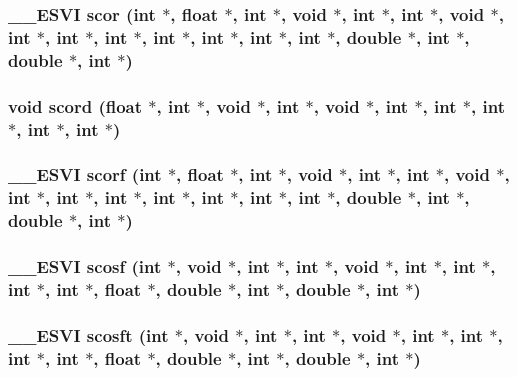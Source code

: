 \subsubsection{\setlength{\rightskip}{0pt plus 5cm}\_\-\_\-ESVI scor (int $\ast$, float $\ast$, int $\ast$, void $\ast$, int $\ast$, int $\ast$, void $\ast$, int $\ast$, int $\ast$, int $\ast$, int $\ast$, int $\ast$, int $\ast$, int $\ast$, double $\ast$, int $\ast$, double $\ast$, int $\ast$)}\label{essl_8h_590c54fa61664aa2058c0f45ea0874f6}


\subsubsection{\setlength{\rightskip}{0pt plus 5cm}void scord (float $\ast$, int $\ast$, void $\ast$, int $\ast$, void $\ast$, int $\ast$, int $\ast$, int $\ast$, int $\ast$, int $\ast$)}\label{essl_8h_312f791c7ec6ad66177cfa896adea156}


\subsubsection{\setlength{\rightskip}{0pt plus 5cm}\_\-\_\-ESVI scorf (int $\ast$, float $\ast$, int $\ast$, void $\ast$, int $\ast$, int $\ast$, void $\ast$, int $\ast$, int $\ast$, int $\ast$, int $\ast$, int $\ast$, int $\ast$, int $\ast$, double $\ast$, int $\ast$, double $\ast$, int $\ast$)}\label{essl_8h_f3d9e592d58086784c64efe83cae3060}


\subsubsection{\setlength{\rightskip}{0pt plus 5cm}\_\-\_\-ESVI scosf (int $\ast$, void $\ast$, int $\ast$, int $\ast$, void $\ast$, int $\ast$, int $\ast$, int $\ast$, int $\ast$, float $\ast$, double $\ast$, int $\ast$, double $\ast$, int $\ast$)}\label{essl_8h_51137ac1b030681c4a36ff62e31105b4}


\subsubsection{\setlength{\rightskip}{0pt plus 5cm}\_\-\_\-ESVI scosft (int $\ast$, void $\ast$, int $\ast$, int $\ast$, void $\ast$, int $\ast$, int $\ast$, int $\ast$, int $\ast$, float $\ast$, double $\ast$, int $\ast$, double $\ast$, int $\ast$)}\label{essl_8h_64938f0a3f19a3e7cfce2c0b76c40375}


